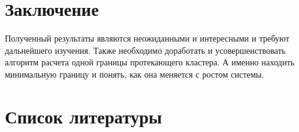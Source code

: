 \documentclass[14pt]{article}
\begin{document}
\begin{figure}[H]
	\begin{floatrow}
	
	\end{floatrow}
\end{figure}
\section{Заключение}
\par Полученный результаты являются неожиданными и интересными и требуют дальнейшего изучения. Также необходимо доработать и усовершенствовать алгоритм расчета одной границы протекающего кластера. А именно находить минимальную границу и понять, как она меняется с ростом системы.\\

\section{Список литературы}
\end{document}
